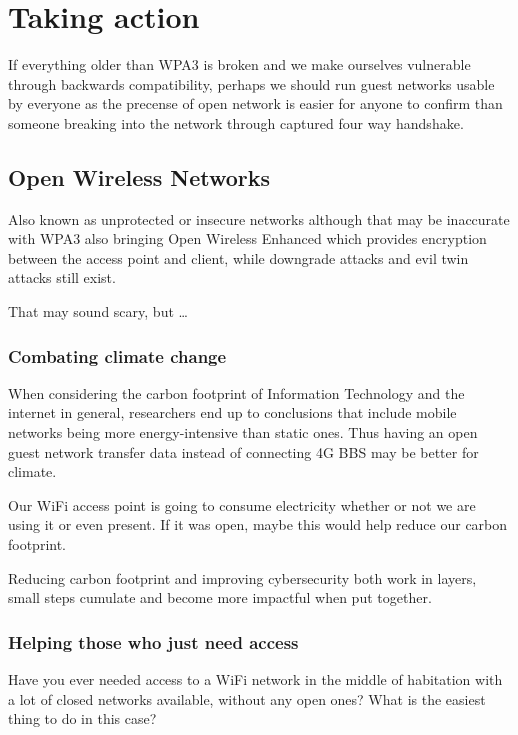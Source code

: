 \documentclass[../wifi-security.tex]{subfiles}
\begin{document}
\section{Taking action}

If everything older than WPA3 is broken and we make ourselves vulnerable through backwards compatibility, perhaps we should run guest networks usable by everyone as the precense of open network is easier for anyone to confirm than someone breaking into the network through captured four way handshake.

\subsection{Open Wireless Networks}

Also known as unprotected or insecure networks although that may be inaccurate with WPA3 also bringing Open Wireless Enhanced which provides encryption between the access point and client, while downgrade attacks and evil twin attacks still exist.

That may sound scary, but \dots

\subsubsection{Combating climate change}


When considering the carbon footprint of Information Technology and the internet in general, researchers end up to conclusions that include mobile networks being more energy-intensive than static ones. Thus having an open guest network transfer data instead of connecting 4G BBS may be better for climate.

Our WiFi access point is going to consume electricity whether or not we are using it or even present. If it was open, maybe this would help reduce our carbon footprint.

Reducing carbon footprint and improving cybersecurity both work in layers, small steps cumulate and become more impactful when put together.

\subsubsection{Helping those who just need access}

Have you ever needed access to a WiFi network in the middle of habitation with a lot of closed networks available, without any open ones? What is the easiest thing to do in this case?
\end{document}
